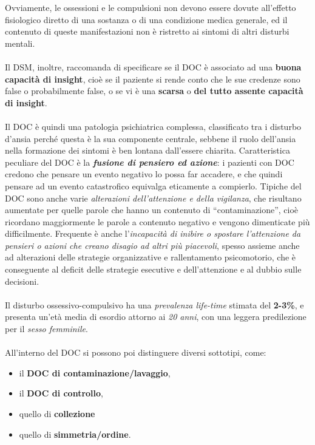 Ovviamente, le ossessioni e le compulsioni non devono essere dovute
all'effetto fisiologico diretto di una sostanza o di una condizione
medica generale, ed il contenuto di queste manifestazioni non è
ristretto ai sintomi di altri disturbi mentali.
\\\\
Il DSM, inoltre, raccomanda di specificare se il DOC è associato ad una
\textbf{buona capacità di insight}, cioè se il paziente si rende conto
che le sue credenze sono false o probabilmente false, o se vi è una
\textbf{scarsa} o \textbf{del tutto assente capacità di insight}.
\\\\
Il DOC è quindi una patologia psichiatrica complessa, classificato tra i
disturbo d'ansia perché questa è la sua componente centrale, sebbene il
ruolo dell'ansia nella formazione dei sintomi è ben lontana dall'essere
chiarita. Caratteristica peculiare del DOC è la \textbf{\emph{fusione di
pensiero ed azione}}: i pazienti con DOC credono che pensare un evento
negativo lo possa far accadere, e che quindi pensare ad un evento
catastrofico equivalga eticamente a compierlo. Tipiche del DOC sono
anche varie \emph{alterazioni dell'attenzione e della vigilanza}, che
risultano aumentate per quelle parole che hanno un contenuto di
``contaminazione'', cioè ricordano maggiormente le parole a contenuto
negativo e vengono dimenticate più difficilmente. Frequente è anche
l'\emph{incapacità di inibire o spostare l'attenzione da pensieri o
azioni che creano disagio ad altri più piacevoli}, spesso assieme anche
ad alterazioni delle strategie organizzative e rallentamento
psicomotorio, che è conseguente al deficit delle strategie esecutive e
dell'attenzione e al dubbio sulle decisioni.
\\\\
Il disturbo ossessivo-compulsivo ha una \emph{prevalenza life-time}
stimata del \textbf{2-3\%}, e presenta un'età media di esordio attorno
ai \emph{20 anni}, con una leggera predilezione per il \emph{sesso
femminile}.
\\\\
All'interno del DOC si possono poi distinguere diversi sottotipi, come:

\begin{itemize}
\item
  il \textbf{DOC di contaminazione/lavaggio},
\item
  il \textbf{DOC di controllo},
\item
  quello di \textbf{collezione}
\item
  quello di \textbf{simmetria/ordine}.
\end{itemize}

